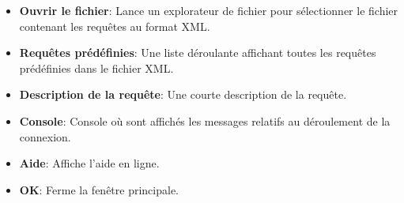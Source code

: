 
\begin{itemize}
\item \textbf{Ouvrir le fichier}: Lance un explorateur de fichier pour sélectionner le fichier contenant les requêtes au format XML.
\item \textbf{Requêtes prédéfinies}: Une liste déroulante affichant toutes les requêtes prédéfinies dans le fichier XML.
\item \textbf{Description de la requête}: Une courte description de la requête.
\item \textbf{Console}: Console où sont affichés les messages relatifs au déroulement de la connexion.
\item \textbf{Aide}: Affiche l'aide en ligne.
\item \textbf{OK}: Ferme la fenêtre principale.
\end{itemize}

\label{evis_xml_format}

